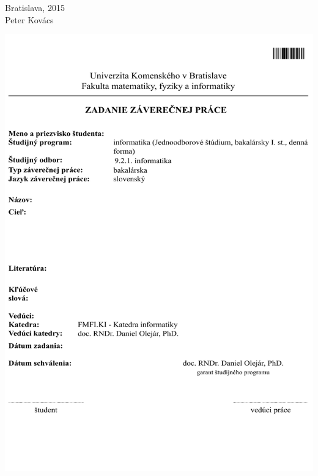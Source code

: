 \documentclass[12pt, oneside]{book}
\def\mfyear{2015}
\def\mfauthor{Peter Kovács}
\def\mfplacedate{Bratislava, \mfyear}
\begin{document}
\noindent \mfplacedate\\
\indent\mfauthor

\eject %





\newpage 
\thispagestyle{empty}
\hspace{-1cm}\includegraphics[width=1.2\textwidth]{images/zadanie}


\frontmatter

\newpage 
\thispagestyle{empty}
\end{document}
